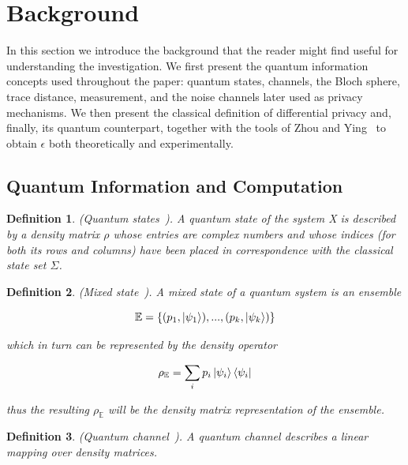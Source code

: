 \documentclass{ieeeaccess}
\newtheorem{definition}{Definition}[section]
\begin{document}
\section{Background}
\label{sec:background}

In this section we introduce the background that the reader might find useful for understanding the investigation. We first present the quantum information concepts used throughout the paper: quantum states, channels, the Bloch sphere, trace distance, measurement, and the noise channels later used as privacy mechanisms. We then present the classical definition of differential privacy and, finally, its quantum counterpart, together with the tools of Zhou and Ying~\cite{zhou2017differential} to obtain $\epsilon$ both theoretically and experimentally.

\subsection{Quantum Information and Computation}

\begin{definition}
    (Quantum states~\cite{watrous_quantum_channels}). A quantum state of the system X is described by a density matrix $\rho$ whose entries are complex numbers and whose indices (for both its rows and columns) have been placed in correspondence with the classical state set $\Sigma$.
    \label{def:quantum_state}
\end{definition}

\begin{definition}
    (Mixed state~\cite{zhou2017differential}). A mixed state of a quantum system is an ensemble

    \[
      \mathbb{E} = \{(p_1,\ket{\psi_1}),...,(p_k,\ket{\psi_k})\}
    \]

    which in turn can be represented by the density operator

    \[
      \rho_{\mathbb{E}} = \sum_{i}p_i\ket{\psi_i}\bra{\psi_i}
    \]

    thus the resulting $\rho_{\mathbb{E}}$ will be the density matrix representation of the ensemble.
    \label{def:mixed_state}
\end{definition}

\begin{definition}
    (Quantum channel~\cite{watrous_quantum_channels}). A quantum channel describes a linear mapping over density matrices.
    \label{def:quantum_channel}
\end{definition}
\end{document}
